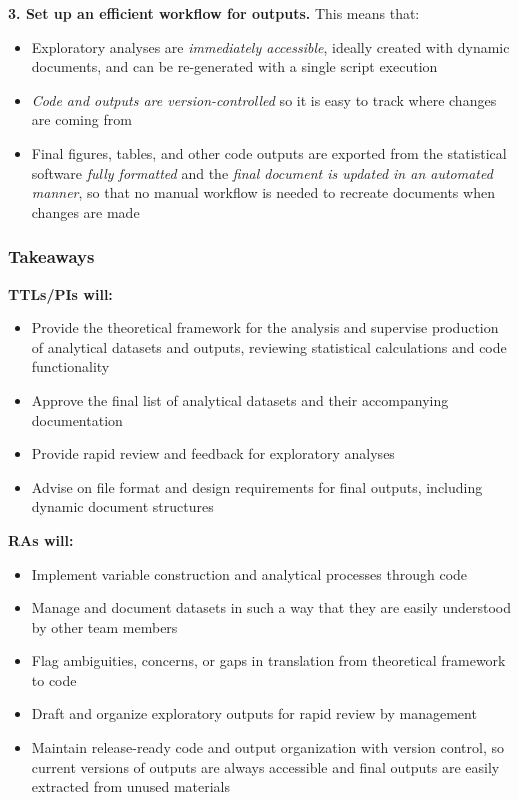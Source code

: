 \documentclass[
]{book}
\providecommand{\tightlist}{%
  \setlength{\itemsep}{0pt}\setlength{\parskip}{0pt}}
\begin{document}
\begin{summary}
\textbf{3. Set up an efficient workflow for outputs.} This means that:

\begin{itemize}
\tightlist
\item
  Exploratory analyses are \emph{immediately accessible}, ideally created with dynamic documents, and can be re-generated with a single script execution
\item
  \emph{Code and outputs are version-controlled} so it is easy to track where changes are coming from
\item
  Final figures, tables, and other code outputs are exported from the statistical software \emph{fully formatted} and the \emph{final document is updated in an automated manner}, so that no manual workflow is needed to recreate documents when changes are made
\end{itemize}

\hypertarget{takeaways-5}{%
\subsubsection*{Takeaways}\label{takeaways-5}}

\textbf{TTLs/PIs will:}

\begin{itemize}
\tightlist
\item
  Provide the theoretical framework for the analysis and supervise production of analytical datasets and outputs, reviewing statistical calculations and code functionality
\item
  Approve the final list of analytical datasets and their accompanying documentation
\item
  Provide rapid review and feedback for exploratory analyses
\item
  Advise on file format and design requirements for final outputs, including dynamic document structures
\end{itemize}

\textbf{RAs will: }

\begin{itemize}
\tightlist
\item
  Implement variable construction and analytical processes through code
\item
  Manage and document datasets in such a way that they are easily understood by other team members
\item
  Flag ambiguities, concerns, or gaps in translation from theoretical framework to code
\item
  Draft and organize exploratory outputs for rapid review by management
\item
  Maintain release-ready code and output organization with version control, so current versions of outputs are always accessible and final outputs are easily extracted from unused materials
\end{itemize}


\end{summary}
\end{document}
